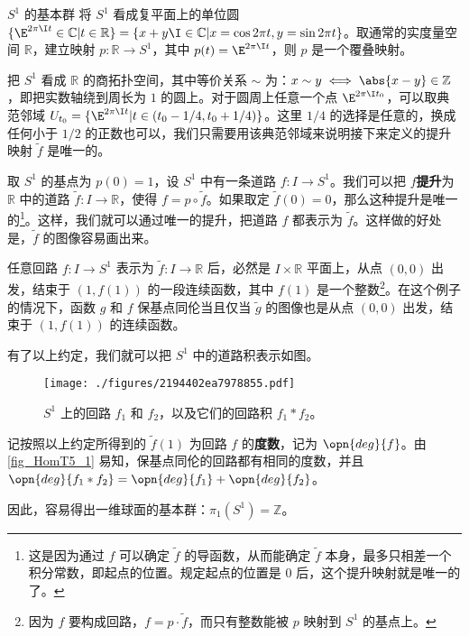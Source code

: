 \begin{example}{$S^1$ 的基本群}\label{ex_HomT5_2}
将 $S^1$ 看成复平面上的单位圆 $\{\E^{2\pi\I t}\in\mathbb{C}|t\in\mathbb{R}\}=\{x+y\I\in\mathbb{C}|x=\cos{2\pi t}, y=\sin{2\pi t}\}$。取通常的实度量空间 $\mathbb{R}$，建立映射 $p:\mathbb{R}\rightarrow S^1$，其中 $p(t)=\E^{2\pi\I t}$，则 $p$ 是一个覆叠映射。

把 $S^1$ 看成 $\mathbb{R}$ 的商拓扑空间，其中等价关系 $\sim$ 为：$x\sim y\iff \abs{x-y}\in\mathbb{Z}$，即把实数轴绕到周长为 $1$ 的圆上。对于圆周上任意一个点 $\E^{2\pi\I t_0}$，可以取典范邻域 $U_{t_0}=\{\E^{2\pi\I t}|t\in(t_0-1/4, t_0+1/4)\}$。这里 $1/4$ 的选择是任意的，换成任何小于 $1/2$ 的正数也可以，我们只需要用该典范邻域来说明接下来定义的提升映射 $\tilde{f}$ 是唯一的。

取 $S^1$ 的基点为 $p(0)=1$，设 $S^1$ 中有一条道路 $f:I\rightarrow S^1$。我们可以把 $f$\textbf{提升}为 $\mathbb{R}$ 中的道路 $\tilde{f}:I\rightarrow\mathbb{R}$，使得 $f=p\circ\tilde{f}$。如果取定 $\tilde{f}(0)=0$，那么这种提升是唯一的\footnote{这是因为通过 $f$ 可以确定 $\tilde{f}$ 的导函数，从而能确定 $\tilde{f}$ 本身，最多只相差一个积分常数，即起点的位置。规定起点的位置是 $0$ 后，这个提升映射就是唯一的了。}。这样，我们就可以通过唯一的提升，把道路 $f$ 都表示为 $\tilde{f}$。这样做的好处是，$\tilde{f}$ 的图像容易画出来。

任意回路 $f:I\rightarrow S^1$ 表示为 $\tilde{f}:I\rightarrow\mathbb{R}$ 后，必然是 $I\times\mathbb{R}$ 平面上，从点 $(0, 0)$ 出发，结束于 $(1, f(1))$ 的一段连续函数，其中 $f(1)$ 是一个整数\footnote{因为 $f$ 要构成回路，$f=p\cdot\tilde{f}$，而只有整数能被 $p$ 映射到 $S^1$ 的基点上。}。在这个例子的情况下，函数 $g$ 和 $f$ 保基点同伦当且仅当 $\tilde{g}$ 的图像也是从点 $(0, 0)$ 出发，结束于 $(1, f(1))$ 的连续函数。

有了以上约定，我们就可以把 $S^1$ 中的道路积表示如图。

\begin{figure}[ht]
\centering
\texttt{[image: ./figures/2194402ea7978855.pdf]}
\caption{$S^1$ 上的回路 $f_1$ 和 $f_2$，以及它们的回路积 $f_1*f_2$。} \label{fig_HomT5_1}
\end{figure}

记按照以上约定所得到的 $\tilde{f}(1)$ 为回路 $f$ 的\textbf{度数}，记为 $\opn{deg}{f}$。由\autoref{fig_HomT5_1} 易知，保基点同伦的回路都有相同的度数，并且 $\opn{deg}{f_1*f_2}=\opn{deg}{f_1}+\opn{deg}{f_2}$。

因此，容易得出一维球面的基本群：$\pi_1(S^1)=\mathbb{Z}$。


\end{example}

